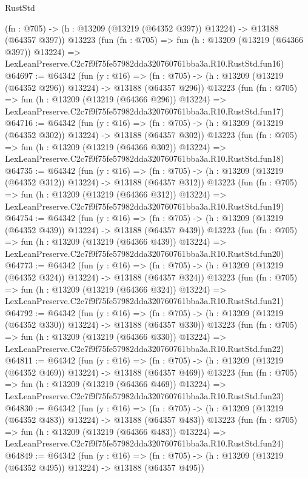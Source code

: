 \begin{lexlean}{RustStd}
\begin{coremodule}
    (fn : @705) -> (h : @13209 (@13219 (@64352 @397)) @13224) -> @13188 (@64357 @397))
    @13223
    (fun (fn : @705) =>
    fun (h : @13209 (@13219 (@64366 @397)) @13224) =>
    LexLeanPreserve.C2c7f9f75fe57982dda320760761bba3a.R10.RustStd.fun16)
@64697 := @64342
    (fun (y : @16) =>
    (fn : @705) -> (h : @13209 (@13219 (@64352 @296)) @13224) -> @13188 (@64357 @296))
    @13223
    (fun (fn : @705) =>
    fun (h : @13209 (@13219 (@64366 @296)) @13224) =>
    LexLeanPreserve.C2c7f9f75fe57982dda320760761bba3a.R10.RustStd.fun17)
@64716 := @64342
    (fun (y : @16) =>
    (fn : @705) -> (h : @13209 (@13219 (@64352 @302)) @13224) -> @13188 (@64357 @302))
    @13223
    (fun (fn : @705) =>
    fun (h : @13209 (@13219 (@64366 @302)) @13224) =>
    LexLeanPreserve.C2c7f9f75fe57982dda320760761bba3a.R10.RustStd.fun18)
@64735 := @64342
    (fun (y : @16) =>
    (fn : @705) -> (h : @13209 (@13219 (@64352 @312)) @13224) -> @13188 (@64357 @312))
    @13223
    (fun (fn : @705) =>
    fun (h : @13209 (@13219 (@64366 @312)) @13224) =>
    LexLeanPreserve.C2c7f9f75fe57982dda320760761bba3a.R10.RustStd.fun19)
@64754 := @64342
    (fun (y : @16) =>
    (fn : @705) -> (h : @13209 (@13219 (@64352 @439)) @13224) -> @13188 (@64357 @439))
    @13223
    (fun (fn : @705) =>
    fun (h : @13209 (@13219 (@64366 @439)) @13224) =>
    LexLeanPreserve.C2c7f9f75fe57982dda320760761bba3a.R10.RustStd.fun20)
@64773 := @64342
    (fun (y : @16) =>
    (fn : @705) -> (h : @13209 (@13219 (@64352 @324)) @13224) -> @13188 (@64357 @324))
    @13223
    (fun (fn : @705) =>
    fun (h : @13209 (@13219 (@64366 @324)) @13224) =>
    LexLeanPreserve.C2c7f9f75fe57982dda320760761bba3a.R10.RustStd.fun21)
@64792 := @64342
    (fun (y : @16) =>
    (fn : @705) -> (h : @13209 (@13219 (@64352 @330)) @13224) -> @13188 (@64357 @330))
    @13223
    (fun (fn : @705) =>
    fun (h : @13209 (@13219 (@64366 @330)) @13224) =>
    LexLeanPreserve.C2c7f9f75fe57982dda320760761bba3a.R10.RustStd.fun22)
@64811 := @64342
    (fun (y : @16) =>
    (fn : @705) -> (h : @13209 (@13219 (@64352 @469)) @13224) -> @13188 (@64357 @469))
    @13223
    (fun (fn : @705) =>
    fun (h : @13209 (@13219 (@64366 @469)) @13224) =>
    LexLeanPreserve.C2c7f9f75fe57982dda320760761bba3a.R10.RustStd.fun23)
@64830 := @64342
    (fun (y : @16) =>
    (fn : @705) -> (h : @13209 (@13219 (@64352 @483)) @13224) -> @13188 (@64357 @483))
    @13223
    (fun (fn : @705) =>
    fun (h : @13209 (@13219 (@64366 @483)) @13224) =>
    LexLeanPreserve.C2c7f9f75fe57982dda320760761bba3a.R10.RustStd.fun24)
@64849 := @64342
    (fun (y : @16) =>
    (fn : @705) -> (h : @13209 (@13219 (@64352 @495)) @13224) -> @13188 (@64357 @495))

\end{coremodule}
\end{lexlean}

